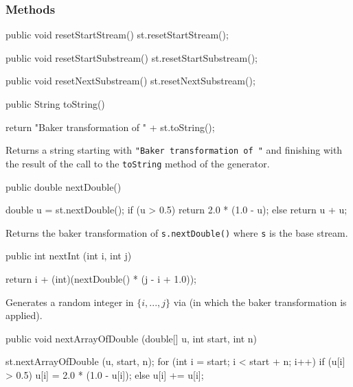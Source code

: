 \subsubsection* {Methods}
\begin{code}\begin{hide}
   public void resetStartStream() {
      st.resetStartStream();
   }

   public void resetStartSubstream() {
      st.resetStartSubstream();
   }

   public void resetNextSubstream() {
      st.resetNextSubstream();
   }\end{hide}

   public String toString() \begin{hide} {
      return "Baker transformation of " + st.toString();
   }\end{hide}
\end{code}
\begin{tabb} Returns a string starting with \texttt{"Baker transformation of "}
  and finishing with the result of the call to the \texttt{toString}
  method of the generator.
\end{tabb}
\begin{code}

   public double nextDouble() \begin{hide} {
      double u = st.nextDouble();
      if (u > 0.5) return 2.0 * (1.0 - u);
      else return u + u;
   }\end{hide}
\end{code}
\begin{tabb} Returns the baker transformation of \texttt{s.nextDouble()} 
  where \texttt{s} is the base stream.
\end{tabb}
\begin{code}

   public int nextInt (int i, int j) \begin{hide} {
      return i + (int)(nextDouble() * (j - i + 1.0));
   }\end{hide}
\end{code} 
\begin{tabb} Generates a random integer in $\{i,...,j\}$ via
  (in which the baker transformation is applied).
\end{tabb}
\begin{code}

   public void nextArrayOfDouble (double[] u, int start, int n) \begin{hide} {
       st.nextArrayOfDouble (u, start, n);
       for (int i = start; i < start + n; i++)
          if (u[i] > 0.5) u[i] = 2.0 * (1.0 - u[i]);
          else u[i] += u[i];
       }\end{hide}
\end{code} 
